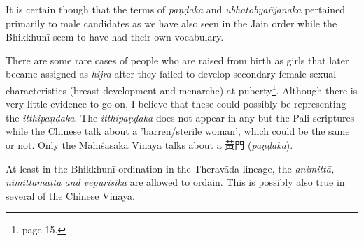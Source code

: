 It is certain though that the terms of {\em paṇḍaka} and {\em ubhatob­yañ­janaka} pertained primarily to male candidates as we have also seen in the Jain order while the Bhikkhunī seem to have had their own vocabulary.

There are some rare cases of people who are raised from birth as girls that later became assigned as {\em hijra} after they failed to develop secondary female sexual characteristics (breast development and menarche) at puberty\footnote{\cite{nanda} page 15.}. Although there is very little evidence to go on, I believe that these could possibly be representing the {\em itthipaṇḍaka}. The {\em itthipaṇḍaka} does not appear in any but the Pali scriptures while the Chinese talk about a 'barren/sterile woman', which could be the same or not. Only the Mahīśāsaka Vinaya talks about a 黃門 ({\em paṇḍaka}). 

At least in the Bhikkhunī ordination in the Theravāda lineage, the {\em animittā, nimittamattā and vepurisikā} are allowed to ordain. This is possibly also true in several of the Chinese Vinaya.

